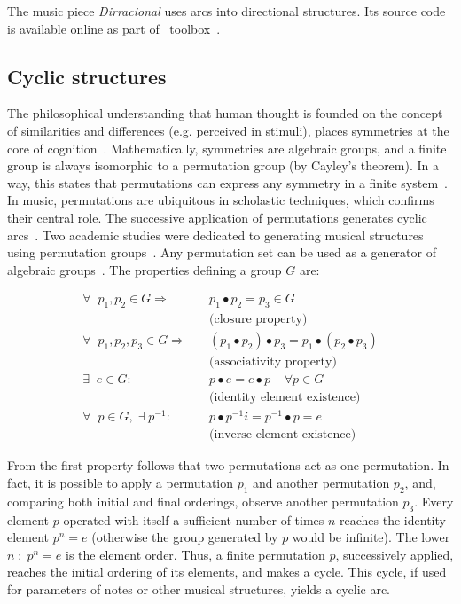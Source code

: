 The music piece \emph{Dirracional} uses arcs into directional structures. Its source code is available online as part
of \massa\ toolbox~\cite{MASSA}.

\subsection{Cyclic structures}\label{estCic}
The philosophical understanding that human thought is founded on the concept of similarities and differences (e.g. perceived in stimuli), places symmetries
at the core of cognition~\cite{Deleuze}. Mathematically, symmetries are algebraic groups, and a finite group is always isomorphic to a permutation
group (by Cayley's theorem).
In a way, this states that permutations can express any symmetry in a
finite system~\cite{gruposFascination}.
In music, permutations are ubiquitous in scholastic techniques,
 which confirms their central role.
The successive application of permutations generates cyclic arcs~\cite{change,Zamacois,permMusic}. Two academic studies were dedicated to generating musical structures using permutation groups~\cite{figgusOriginal, figgusEspacializacao}. Any permutation set can be used as a generator of algebraic groups~\cite{permMusic}.
The properties defining a group $G$ are:

\begin{equation}\label{eq:groups}
\begin{split}
\forall \;\; p_1,p_2 \in G \Rightarrow  \quad   & p_1 \bullet p_2  = p_3 \in G \\ 
     & \text{(closure property)} \\
\forall \;\; p_1,p_2,p_3 \in G \Rightarrow \quad & (p_1\bullet p_2)\bullet p_3  = p_1\bullet (p_2\bullet p_3) \\
     & \text{(associativity property)} \\
\exists \;\; e \in G :                  \quad    & p \bullet e  = e \bullet p \;\;\;\; \forall p \in G  \\ 
     &  \text{(identity element existence)} \\
\forall \;\; p \in G, \;\exists\; p^{-1} :\quad  &  p\bullet p^{-1}i =p^{-1}\bullet p = e \\
     &  \text{(inverse element existence)}
\end{split}
\end{equation}

From the first property follows that two permutations act as one permutation. In fact, it is possible to apply a
permutation $p_1$ and another permutation $p_2$, and, comparing both initial and final orderings, observe another permutation $p_3$. Every element $p$ operated with itself a sufficient number of times $n$ reaches the identity element $p^n=e$ (otherwise the group generated by $p$ would be infinite). The lower $n\;:\;p^n=e$ is the element order. Thus, a finite
permutation $p$, successively applied, reaches the initial ordering of its
elements, and makes a cycle. This cycle, if used for parameters of notes or other musical structures,
yields a cyclic arc.

